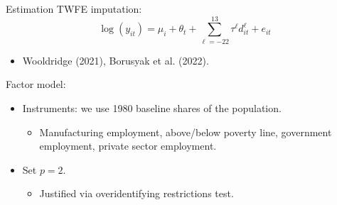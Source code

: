 \documentclass{beamer}
\newcommand{\1}{\mathds{1}} %
\begin{document}

\begin{frame}{Estimation}
    TWFE imputation:
    \begin{equation}
        \log(y_{it}) = \mu_i + \theta_t + \sum_{\ell = -22}^{13} \tau^\ell d_{it}^\ell + e_{it}
    \end{equation}
    \begin{itemize}
        \item Wooldridge (2021), Borusyak et al. (2022). 
    \end{itemize}

    \vspace{.5cm}

    Factor model:
    \begin{itemize}
        \item Instruments: we use 1980 baseline shares of the population.
        \begin{itemize}
            \item Manufacturing employment, above/below poverty line, government employment, private sector employment. 
        \end{itemize}
        \item Set $p = 2$. 
        \begin{itemize}
            \item Justified via overidentifying restrictions test. 
        \end{itemize}
    \end{itemize}
\end{frame}

\end{document}
